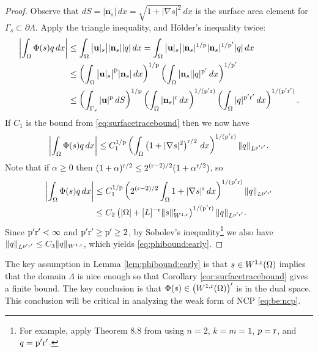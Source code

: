 \documentclass[hidelinks,onefignum,onetabnum,final]{siamart220329}  %
\newcommand{\grad}{\nabla}
\newcommand{\bn}{\mathbf{n}}
\newcommand{\bu}{\mathbf{u}}
\newcommand{\pp}{{\text{\textnormal{p}}}}
\newcommand{\rr}{{\text{\textnormal{r}}}}
\begin{document}
\begin{proof}  Observe that $dS = |\bn_s|\,dx = \sqrt{1+|\grad s|^2}\,dx$ is the surface area element for $\Gamma_s \subset \partial \Lambda$.  Apply the triangle inequality, and H\"older's inequality twice:
\begin{align}
\left|\int_\Omega \Phi(s) q\,dx\right| &\le \int_\Omega \big|\bu|_s\big| |\bn_s| |q|\,dx = \int_\Omega \big|\bu|_s\big| |\bn_s|^{1/\pp} |\bn_s|^{1/\pp'} |q|\,dx \label{eq:phibound:zero} \\
    &\le \left(\int_\Omega \big|\bu|_s\big|^\pp |\bn_s|\,dx\right)^{1/\pp} \left(\int_\Omega |\bn_s| |q|^{\pp'} \,dx\right)^{1/\pp'} \notag \\
    &\le \left(\int_{\Gamma_s} |\bu|^\pp \,dS\right)^{1/\pp} \left(\int_\Omega |\bn_s|^\rr \,dx\right)^{1/(\pp'\rr)} \left(\int_\Omega |q|^{\pp'\rr'} \,dx\right)^{1/(\pp'\rr')}. \notag
\end{align}
If $C_1$ is the bound from \eqref{eq:surfacetracebound} then we now have
\begin{equation}
\left|\int_\Omega \Phi(s) q\,dx\right| \le C_1^{1/\pp} \left(\int_\Omega \left(1+|\grad s|^2\right)^{\rr/2}\,dx\right)^{1/(\pp'\rr)} \|q\|_{L^{\pp'\rr'}}.
\end{equation}
Note that if $\alpha\ge 0$ then $(1+\alpha)^{\rr/2} \le 2^{(\rr-2)/2} (1+\alpha^{\rr/2})$, so
\begin{align}
\left|\int_\Omega \Phi(s) q\,dx\right| &\le C_1^{1/\pp} \left(2^{(\rr-2)/2} \int_\Omega 1 + |\grad s|^\rr\,dx\right)^{1/(\pp'\rr)} \|q\|_{L^{\pp'\rr'}} \label{eq:phibound:one} \\
  &\le C_2 \left(|\Omega| + [L]^{-\rr}\|s\|_{W^{1,\rr}}^\rr\right)^{1/(\pp'\rr)} \|q\|_{L^{\pp'\rr'}}. \notag
\end{align}
Since $\pp'\rr' < \infty$ and $\pp'\rr' \ge \pp' \ge 2$, by Sobolev's inequality\footnote{For example, apply Theorem 8.8 from \cite{LiebLoss1997} using $n=2$, $k=m=1$, $p=\rr$, and $q=\pp'\rr'$.} we also have $\|q\|_{L^{\pp'\rr'}} \le C_3 \|q\|_{W^{1,\rr}}$, which yields \eqref{eq:phibound:early}.
\end{proof}

The key assumption in Lemma \ref{lem:phibound:early} is that $s\in W^{1,\rr}(\Omega)$ implies that the domain $\Lambda$ is nice enough so that Corollary \ref{cor:surfacetracebound} gives a finite bound.  The key conclusion is that $\Phi(s) \in \left(W^{1,\rr}(\Omega)\right)'$ is in the dual space.  This conclusion will be critical in analyzing the weak form of NCP \eqref{eq:be:ncp}.
\end{document}
